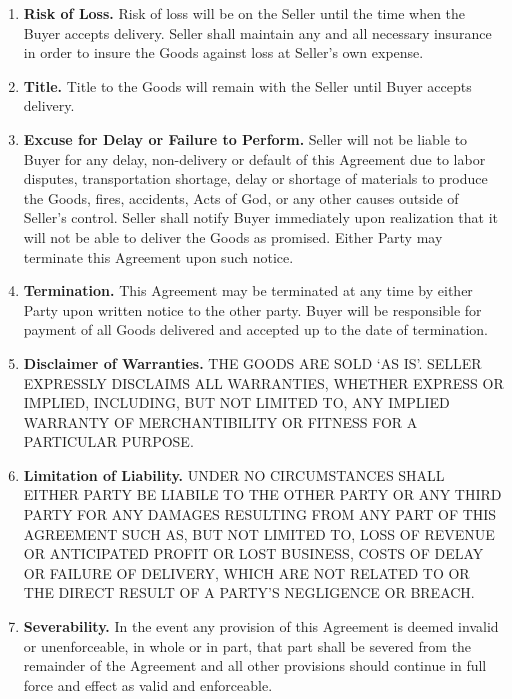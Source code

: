 \documentclass[letterpaper]{article}
\begin{document}
\begin{enumerate}
        \item \textbf{Risk of Loss.} Risk of loss will be on the Seller until the time when the Buyer accepts delivery. Seller shall maintain any and all necessary insurance in order to insure the Goods against loss at Seller’s own expense.

        \item \textbf{Title.} Title to the Goods will remain with the Seller until Buyer accepts delivery.

        \item \textbf{Excuse for Delay or Failure to Perform.} Seller will not be liable to Buyer for any delay, non-delivery or default of this Agreement due to labor disputes, transportation shortage, delay or shortage of materials to produce the Goods, fires, accidents, Acts of God, or any other causes outside of Seller’s control. Seller shall notify Buyer immediately upon realization that it will not be able to deliver the Goods as promised. Either Party may terminate this Agreement upon such notice.

        \item \textbf{Termination.} This Agreement may be terminated at any time by either Party upon written notice to the other party. Buyer will be responsible for payment of all Goods delivered and accepted up to the date of termination. 

        \item \textbf{Disclaimer of Warranties.} THE GOODS ARE SOLD ‘AS IS’. SELLER EXPRESSLY DISCLAIMS ALL WARRANTIES, WHETHER EXPRESS OR IMPLIED, INCLUDING, BUT NOT LIMITED TO, ANY IMPLIED WARRANTY OF MERCHANTIBILITY OR FITNESS FOR A PARTICULAR PURPOSE. 

        \item \textbf{Limitation of Liability.} UNDER NO CIRCUMSTANCES SHALL EITHER PARTY BE LIABILE TO THE OTHER PARTY OR ANY THIRD PARTY FOR ANY DAMAGES RESULTING FROM ANY PART OF THIS AGREEMENT SUCH AS, BUT NOT LIMITED TO, LOSS OF REVENUE OR ANTICIPATED PROFIT OR LOST BUSINESS, COSTS OF DELAY OR FAILURE OF DELIVERY, WHICH ARE NOT RELATED TO OR THE DIRECT RESULT OF A PARTY’S NEGLIGENCE OR BREACH.

        \item \textbf{Severability.} In the event any provision of this Agreement is deemed invalid or unenforceable, in whole or in part, that part shall be severed from the remainder of the Agreement and all other provisions should continue in full force and effect as valid and enforceable. 


\end{enumerate}
\end{document}

